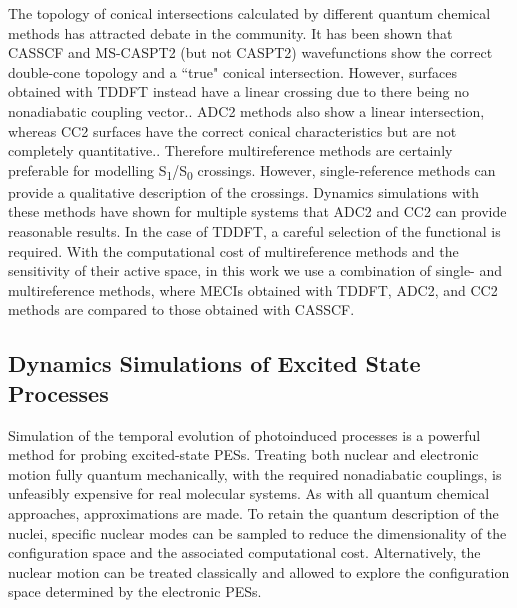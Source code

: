 The topology of conical intersections calculated by different quantum chemical methods has attracted debate in the community.\cite{Levine2006a,Gozem2014,Tuna2015,Lefrancois2017} It has been shown that CASSCF and MS-CASPT2 (but not CASPT2) wavefunctions show the correct double-cone topology and a ``true" conical intersection. However, surfaces obtained with \ac{TDDFT} instead have a linear crossing due to there being no nonadiabatic coupling vector.\cite{Gozem2014}. \ac{ADC2} methods also show a linear intersection, whereas \ac{CC}2 surfaces have the correct conical characteristics but are not completely quantitative.\cite{Tuna2015}. Therefore multireference methods are certainly preferable for modelling S\textsubscript{1}/S\textsubscript{0} crossings. However, single-reference methods can provide a qualitative description of the crossings. Dynamics simulations with these methods have shown for multiple systems that ADC2 and CC2 can provide reasonable results.\cite{Gozem2014,Tuna2015} In the case of TDDFT, a careful selection of the functional is required.\cite{Crespo-Otero2014,Barbatti2015} With the computational cost of multireference methods and the sensitivity of their active space, in this work we use a combination of single- and multireference methods, where \acp{MECI} obtained with \ac{TDDFT}, \ac{ADC2}, and \ac{CC}2 methods are compared to those obtained with CASSCF.

\subsection{Dynamics Simulations of Excited State Processes}\label{section: photo_dynamics}
Simulation of the temporal evolution of photoinduced processes is a powerful method for probing excited-state \acp{PES}. Treating both nuclear and electronic motion fully quantum mechanically, with the required nonadiabatic couplings, is unfeasibly expensive for real molecular systems. As with all quantum chemical approaches, approximations are made. To retain the quantum description of the nuclei, specific nuclear modes can be sampled to reduce the dimensionality of the configuration space and the associated computational cost. Alternatively, the nuclear motion can be treated classically and allowed to explore the configuration space determined by the electronic \acp{PES}. 

